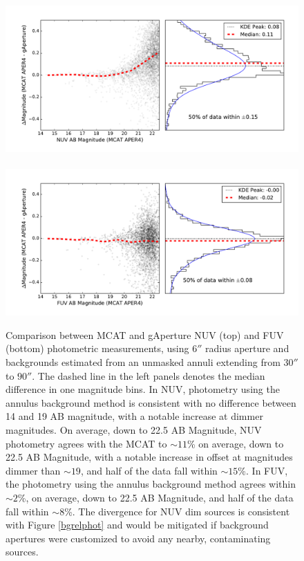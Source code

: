 \documentclass[preprint]{aastex}
\begin{document}
\clearpage
\begin{figure}[t!]
\includegraphics[scale=0.64]{Fig04a.pdf}\\\\
\includegraphics[scale=0.64]{Fig04b.pdf}
\caption{Comparison between MCAT and gAperture NUV (top) and FUV (bottom) photometric measurements, using $6''$ radius aperture and backgrounds estimated from an unmasked annuli extending from $30''$ to $90''$. The dashed line in the left panels denotes the median difference in one magnitude bins. In NUV, photometry using the annulus background method is consistent with no difference between 14 and  19 AB magnitude, with a notable increase at dimmer magnitudes. On average, down to 22.5 AB Magnitude, NUV photometry agrees with the MCAT to $\sim 11$\% on average, down to 22.5 AB Magnitude, with a notable increase in offset at magnitudes dimmer than $\sim19$, and half of the data fall within $\sim 15$\%. In FUV, the photometry using the annulus background method agrees within $\sim 2$\%, on average, down to 22.5 AB Magnitude, and half of the data fall within $\sim 8$\%. The divergence for NUV dim sources is consistent with Figure \ref{bgrelphot} and would be mitigated if background apertures were customized to avoid any nearby, contaminating sources.
\label{annulusrelphot}}
\end{figure}
\clearpage
\end{document}
